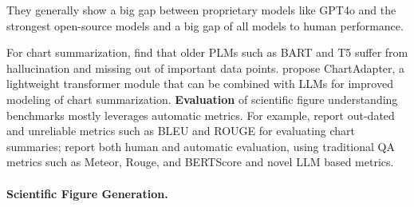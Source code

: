 \fi 
They generally  
show a big gap between proprietary models like GPT4o and the strongest open-source models and a big gap of all models to human performance. 
\iffalse 
\citet{li-etal-2024-multimodal-arxiv} %
likewise explore multiple recent LLMs on their benchmark ArxivQA, finding  
that recent open-source %
models such as Qwen do not perform well on the benchmark but can be improved by fine-tuning on it. 
\fi 
For chart summarization, \citet{Rahman2023ChartSummAC} find that older PLMs such as BART and T5 suffer from hallucination and missing out of important data points. \citet{xu2024chartadapterlargevisionlanguagemodel} propose ChartAdapter, a lightweight transformer module that can be combined with LLMs for improved modeling of chart summarization. %
\textbf{Evaluation} of scientific figure understanding benchmarks %
mostly leverages 
automatic metrics. For example, \citet{xu2024chartadapterlargevisionlanguagemodel} report out-dated and unreliable metrics such as BLEU and ROUGE for evaluating chart summaries; %
\citet{pramanick2024spiqa} report both human and automatic evaluation, using traditional QA metrics such as Meteor, Rouge, and BERTScore and novel LLM based metrics. 


\paragraph{Scientific Figure Generation.}

